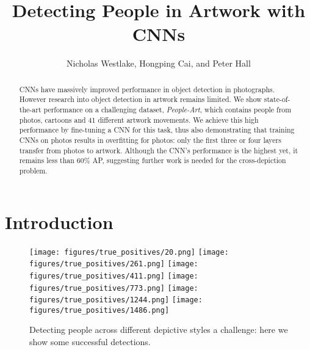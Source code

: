 \documentclass[runningheads]{llncs}
\begin{document}
\pagestyle{headings}
\mainmatter
\def\ECCV16SubNumber{18}  

\title{Detecting People in Artwork with CNNs}


\author{Nicholas Westlake, Hongping Cai, and Peter Hall}

\maketitle

\begin{abstract}
  CNNs have massively improved performance in object detection in photographs.
  However research into object detection in artwork remains limited.
  We show state-of-the-art performance on a challenging dataset, \emph{People-Art}, which contains people from photos, cartoons and 41 different artwork movements.
  We achieve this high performance by fine-tuning a CNN for this task, thus also demonstrating that training CNNs on photos results in overfitting for photos: only the first three or four layers transfer from photos to artwork.
  Although the CNN's performance is the highest yet, it remains less than 60\% AP, suggesting further work is needed for the cross-depiction problem.
\end{abstract}

\section{Introduction}
\begin{figure}[b]
    \texttt{[image: figures/true\_positives/20.png]} \hfill
    \texttt{[image: figures/true\_positives/261.png]} \hfill
    \texttt{[image: figures/true\_positives/411.png]} \hfill
    \texttt{[image: figures/true\_positives/773.png]} \hfill
    \texttt{[image: figures/true\_positives/1244.png]} \hfill
    \texttt{[image: figures/true\_positives/1486.png]}
\caption{Detecting people across different depictive styles a challenge: here we show some successful detections.}
\end{figure}
\end{document}
